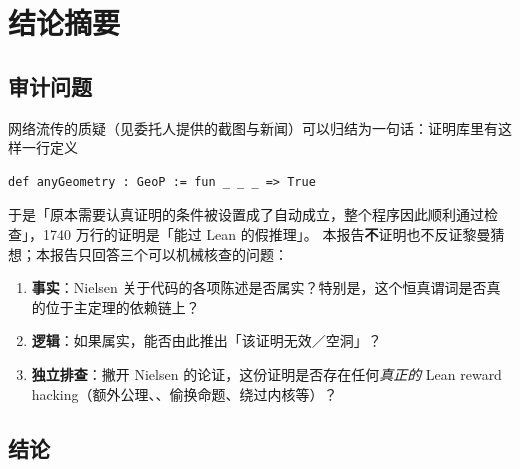 \section{结论摘要}

\subsection{审计问题}

网络流传的质疑（见委托人提供的截图与新闻）可以归结为一句话：证明库里有这样一行定义
\begin{Verbatim}[fontsize=\small,frame=single,rulecolor=\color{gray!50}]
def anyGeometry : GeoP := fun _ _ _ => True
\end{Verbatim}
\noindent 于是「原本需要认真证明的条件被设置成了自动成立，整个程序因此顺利通过检查」，1740 万行的证明是「能过 Lean 的假推理」。
本报告\textbf{不}证明也不反证黎曼猜想；本报告只回答三个可以机械核查的问题：

\begin{enumerate}[label=\textbf{Q\arabic*.},leftmargin=3em]
\item \textbf{事实}：Nielsen 关于代码的各项陈述是否属实？特别是，这个恒真谓词是否真的位于主定理的依赖链上？
\item \textbf{逻辑}：如果属实，能否由此推出「该证明无效／空洞」？
\item \textbf{独立排查}：撇开 Nielsen 的论证，这份证明是否存在任何\emph{真正的} Lean reward hacking（额外公理、、偷换命题、绕过内核等）？
\end{enumerate}

\subsection{结论}

